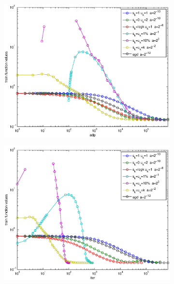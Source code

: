 \documentclass[12pt]{article}
\begin{document}
	\begin{figure}[H]
	\begin{subfigure}[b]{.5\linewidth}
		        \includegraphics[width=4in]{Figures/whowins1.eps}
	\end{subfigure}%
	\begin{subfigure}[b]{.5\linewidth}
		        \includegraphics[width=4in]{Figures/whowins2.eps}
	\end{subfigure}%


\end{figure}
\end{document}
